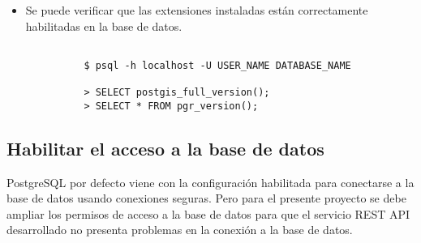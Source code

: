\begin{itemize}
  \item Se puede verificar que las extensiones instaladas están correctamente habilitadas en la base de datos.
  \begin{center}
    \begin{lstlisting}[label=enable_extensions,caption=Habilitación de las Extensiones.]

          $ psql -h localhost -U USER_NAME DATABASE_NAME

          > SELECT postgis_full_version();
          > SELECT * FROM pgr_version();
    \end{lstlisting}
  \end{center}

\end{itemize}


\subsection{Habilitar el acceso a la base de datos}

PostgreSQL por defecto viene con la configuración habilitada para conectarse a la base de datos usando conexiones seguras. Pero  para el presente proyecto se debe ampliar los permisos de acceso a la base de datos para que el servicio REST API desarrollado no presenta problemas en la conexión a la base de datos.

